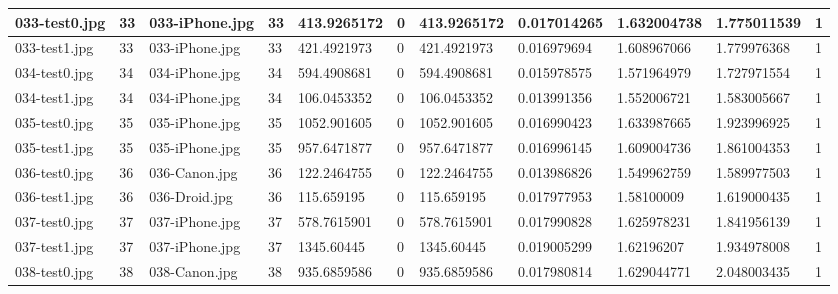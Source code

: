 \begin{landscape}
\begin{longtable}{|p{2cm}|p{1cm}|p{2cm}|p{1cm}|p{2cm}|p{1cm}|p{2cm}|p{2cm}|p{2cm}|p{2cm}|p{1cm}|}
	\hline
	033-test0.jpg & 33       & 033-iPhone.jpg & 33                   & 413.9265172   & 0                & 413.9265172         & 0.017014265   & 1.632004738   & 1.775011539       & 1         \\ 
	\hline
	033-test1.jpg & 33       & 033-iPhone.jpg & 33                   & 421.4921973   & 0                & 421.4921973         & 0.016979694   & 1.608967066   & 1.779976368       & 1         \\ 
	\hline
	034-test0.jpg & 34       & 034-iPhone.jpg & 34                   & 594.4908681   & 0                & 594.4908681         & 0.015978575   & 1.571964979   & 1.727971554       & 1         \\ 
	\hline
	034-test1.jpg & 34       & 034-iPhone.jpg & 34                   & 106.0453352   & 0                & 106.0453352         & 0.013991356   & 1.552006721   & 1.583005667       & 1         \\ 
	\hline
	035-test0.jpg & 35       & 035-iPhone.jpg & 35                   & 1052.901605   & 0                & 1052.901605         & 0.016990423   & 1.633987665   & 1.923996925       & 1         \\ 
	\hline
	035-test1.jpg & 35       & 035-iPhone.jpg & 35                   & 957.6471877   & 0                & 957.6471877         & 0.016996145   & 1.609004736   & 1.861004353       & 1         \\ 
	\hline
	036-test0.jpg & 36       & 036-Canon.jpg  & 36                   & 122.2464755   & 0                & 122.2464755         & 0.013986826   & 1.549962759   & 1.589977503       & 1         \\ 
	\hline
	036-test1.jpg & 36       & 036-Droid.jpg  & 36                   & 115.659195    & 0                & 115.659195          & 0.017977953   & 1.58100009    & 1.619000435       & 1         \\ 
	\hline
	037-test0.jpg & 37       & 037-iPhone.jpg & 37                   & 578.7615901   & 0                & 578.7615901         & 0.017990828   & 1.625978231   & 1.841956139       & 1         \\ 
	\hline
	037-test1.jpg & 37       & 037-iPhone.jpg & 37                   & 1345.60445    & 0                & 1345.60445          & 0.019005299   & 1.62196207    & 1.934978008       & 1         \\ 
	\hline
	038-test0.jpg & 38       & 038-Canon.jpg  & 38                   & 935.6859586   & 0                & 935.6859586         & 0.017980814   & 1.629044771   & 2.048003435       & 1         \\ 

\end{longtable}
\end{landscape}

